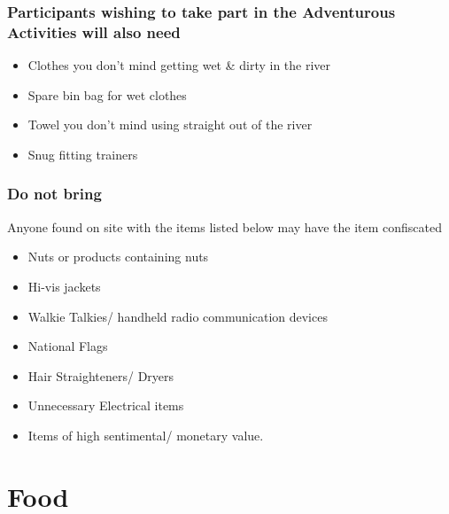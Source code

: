 \documentclass[a4paper, 11pt]{report}
\begin{document}
\subsection{Participants wishing to take part in the Adventurous Activities will also need}
\begin{itemize}
    \item Clothes you don't mind getting wet \& dirty in the river
    \item Spare bin bag for wet clothes
    \item Towel you don't mind using straight out of the river
    \item Snug fitting trainers
\end{itemize}
\subsection{Do not bring}
Anyone found on site with the items listed below may have the item confiscated
\begin{itemize}
    \item Nuts or products containing nuts
    \item Hi-vis jackets
    \item Walkie Talkies/ handheld radio communication devices
    \item National Flags
    \item Hair Straighteners/ Dryers
    \item Unnecessary Electrical items
    \item Items of high sentimental/ monetary value.
\end{itemize}

\chapter{Food}
\end{document}
